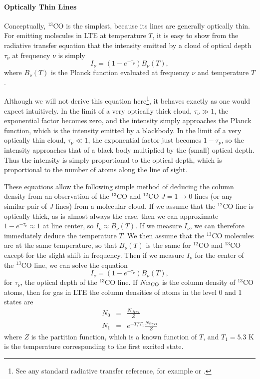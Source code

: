 \paragraph{Optically Thin Lines}

Conceptually, $^{13}$CO is the simplest, because its lines are generally optically thin. For emitting molecules in LTE at temperature $T$, it is easy to show from the radiative transfer equation that the intensity emitted by a cloud of optical depth $\tau_{\nu}$ at frequency $\nu$ is simply
\begin{equation}
I_{\nu} = \left(1-e^{-\tau_{\nu}}\right) B_{\nu}(T),
\end{equation}
where $B_{\nu}(T)$ is the Planck function evaluated at frequency $\nu$ and temperature $T$.

Although we will not derive this equation here\footnote{See any standard radiative transfer reference, for example \citet{rybicki86a} or \citet{shu91a}.}, it behaves exactly as one would expect intuitively. In the limit of a very optically thick cloud, $\tau_{\nu}\gg 1$, the exponential factor becomes zero, and the intensity simply approaches the Planck function, which is the intensity emitted by a blackbody. In the limit of a very optically thin cloud, $\tau_{\nu}\ll 1$, the exponential factor just becomes $1-\tau_{\nu}$, so the intensity approaches that of a black body multiplied by the (small) optical depth. Thus the intensity is simply proportional to the optical depth, which is proportional to the number of atoms along the line of sight.

These equations allow the following simple method of deducing the column density from an observation of the $^{13}$CO and $^{12}$CO $J=1\rightarrow 0$ lines (or any similar pair of $J$ lines) from a molecular cloud. If we assume that the $^{12}$CO line is optically thick, as is almost always the case, then we can approximate $1-e^{-\tau_{\nu}}\approx 1$ at line center, so $I_{\nu} \approx B_{\nu}(T)$. If we measure $I_{\nu}$, we can therefore immediately deduce the temperature $T$. We then assume that the $^{13}$CO molecules are at the same temperature, so that $B_{\nu}(T)$ is the same for $^{12}$CO and $^{13}$CO except for the slight shift in frequency. Then if we measure $I_\nu$ for the center of the $^{13}$CO line, we can solve the equation
\begin{equation}
I_{\nu} = \left(1-e^{-\tau_{\nu}}\right) B_{\nu}(T),
\end{equation}
for $\tau_{\nu}$, the optical depth of the $^{13}$CO line. If $N_{\rm ^{13}CO}$ is the column density of $^{13}$CO atoms, then for gas in LTE the column densities of atoms in the level 0 and 1 states are
\begin{eqnarray*}
N_0 & = & \frac{N_{^{13}CO}}{Z} \\
N_1 & = & e^{-T/T_1}\frac{N_{^{13}CO}}{Z}
\end{eqnarray*}
where $Z$ is the partition function, which is a known function of $T$, and $T_1=5.3$ K is the temperature corresponding to the first excited state.

